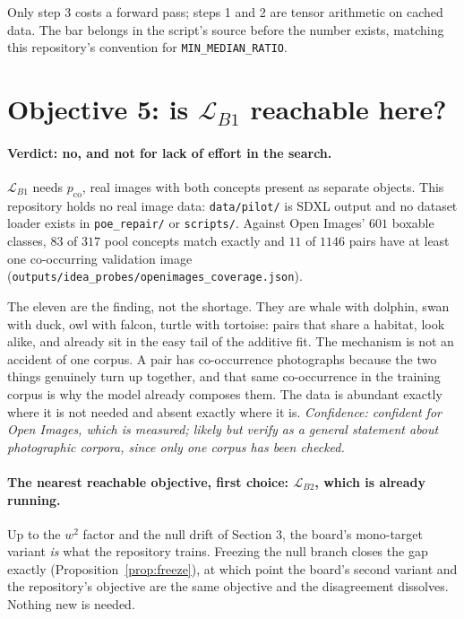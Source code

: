 \documentclass[11pt]{article}
\theoremstyle{plain}
\theoremstyle{remark}
\begin{document}
Only step 3 costs a forward pass; steps 1 and 2 are tensor arithmetic on cached data. The bar belongs
in the script's source before the number exists, matching this repository's convention for
\texttt{MIN\_MEDIAN\_RATIO}.

\section{Objective 5: is \texorpdfstring{$\mathcal{L}_{B1}$}{the data-target objective} reachable here?}

\paragraph{Verdict: no, and not for lack of effort in the search.}
$\mathcal{L}_{B1}$ needs $p_{\mathrm{co}}$, real images with both concepts present as separate
objects. This repository holds no real image data: \texttt{data/pilot/} is SDXL output and no dataset
loader exists in \texttt{poe\_repair/} or \texttt{scripts/}. Against Open Images' $601$ boxable
classes, $83$ of $317$ pool concepts match exactly and $11$ of $1146$ pairs have at least one
co-occurring validation image (\texttt{outputs/idea\_probes/openimages\_coverage.json}).

The eleven are the finding, not the shortage. They are whale with dolphin, swan with duck, owl with
falcon, turtle with tortoise: pairs that share a habitat, look alike, and already sit in the easy
tail of the additive fit. The mechanism is not an accident of one corpus. A pair has co-occurrence
photographs because the two things genuinely turn up together, and that same co-occurrence in the
training corpus is why the model already composes them. The data is abundant exactly where it is not
needed and absent exactly where it is. \emph{Confidence: confident for Open Images, which is
measured; likely but verify as a general statement about photographic corpora, since only one corpus
has been checked.}

\paragraph{The nearest reachable objective, first choice: $\mathcal{L}_{B2}$, which is already running.}
Up to the $w^2$ factor and the null drift of Section 3, the board's mono-target variant \emph{is} what
the repository trains. Freezing the null branch closes the gap exactly (Proposition~\ref{prop:freeze}),
at which point the board's second variant and the repository's objective are the same objective and
the disagreement dissolves. Nothing new is needed.
\end{document}

